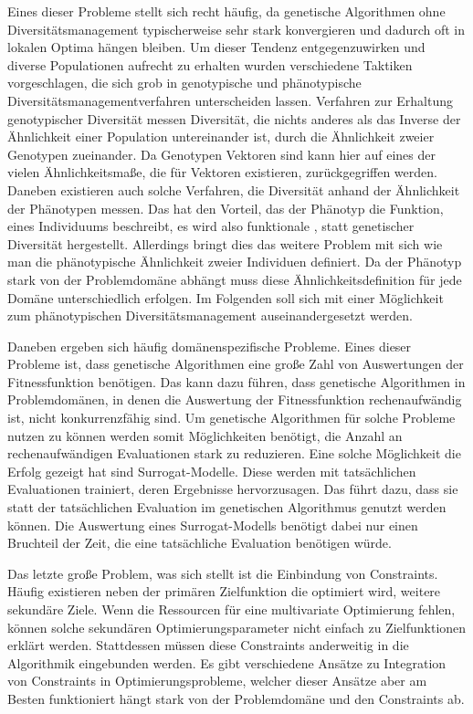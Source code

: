 Eines dieser Probleme stellt sich recht häufig, da genetische Algorithmen ohne Diversitätsmanagement typischerweise sehr stark konvergieren und dadurch oft in lokalen Optima hängen bleiben.
Um dieser Tendenz entgegenzuwirken und diverse Populationen aufrecht zu erhalten wurden verschiedene Taktiken vorgeschlagen, die sich grob in genotypische und phänotypische Diversitätsmanagementverfahren unterscheiden lassen.
Verfahren zur Erhaltung genotypischer Diversität messen Diversität, die nichts anderes als das Inverse der Ähnlichkeit einer Population untereinander ist, durch die Ähnlichkeit zweier Genotypen zueinander.
Da Genotypen Vektoren sind kann hier auf eines der vielen Ähnlichkeitsmaße, die für Vektoren existieren, zurückgegriffen werden.
Daneben existieren auch solche Verfahren, die Diversität anhand der Ähnlichkeit der Phänotypen messen.
Das hat den Vorteil, das der Phänotyp die Funktion, eines Individuums beschreibt, es wird also funktionale , statt genetischer Diversität hergestellt.
Allerdings bringt dies das weitere Problem mit sich wie man die phänotypische Ähnlichkeit zweier Individuen definiert.
Da der Phänotyp stark von der Problemdomäne abhängt muss diese Ähnlichkeitsdefinition für jede Domäne unterschiedlich erfolgen.
Im Folgenden soll sich mit einer Möglichkeit zum phänotypischen Diversitätsmanagement auseinandergesetzt werden.

Daneben ergeben sich häufig domänenspezifische Probleme.
Eines dieser Probleme ist, dass genetische Algorithmen eine große Zahl von Auswertungen der Fitnessfunktion benötigen.
Das kann dazu führen, dass genetische Algorithmen in Problemdomänen, in denen die Auswertung der Fitnessfunktion rechenaufwändig ist, nicht konkurrenzfähig sind.
Um genetische Algorithmen für solche Probleme nutzen zu können werden somit Möglichkeiten benötigt, die Anzahl an rechenaufwändigen Evaluationen stark zu reduzieren.
Eine solche Möglichkeit die Erfolg gezeigt hat sind Surrogat-Modelle.
Diese werden mit tatsächlichen Evaluationen trainiert, deren Ergebnisse hervorzusagen.
Das führt dazu, dass sie statt der tatsächlichen Evaluation im genetischen Algorithmus genutzt werden können.
Die Auswertung eines Surrogat-Modells benötigt dabei nur einen Bruchteil der Zeit, die eine tatsächliche Evaluation benötigen würde.

Das letzte große Problem, was sich stellt ist die Einbindung von Constraints.
Häufig existieren neben der primären Zielfunktion die optimiert wird, weitere sekundäre Ziele.
Wenn die Ressourcen für eine multivariate Optimierung fehlen, können solche sekundären Optimierungsparameter nicht einfach zu Zielfunktionen erklärt werden.
Stattdessen müssen diese Constraints anderweitig in die Algorithmik eingebunden werden.
Es gibt verschiedene Ansätze zu Integration von Constraints in Optimierungsprobleme, welcher dieser Ansätze aber am Besten funktioniert hängt stark von der Problemdomäne und den Constraints ab.


